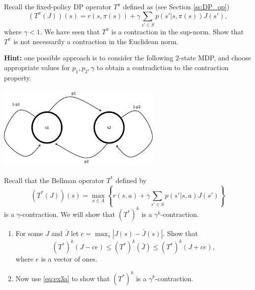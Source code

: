 \begin{exercise}
Recall the fixed-policy DP operator ${T^\pi }$ defined as (see Section \ref{ss:DP_op})
\[\left( {{T^\pi }\left( J \right)} \right)\left( s \right) = r\left( {s,\pi (s)} \right) + \gamma {\sum _{s' \in S}}p\left( {s'|s,\pi (s)} \right)J\left( {s'} \right),\]
where $\gamma  < 1$. We have seen that ${T^\pi }$ is a contraction in the sup-norm. Show that ${T^\pi }$ is not necessarily a contraction in the Euclidean norm.

\textbf{Hint: }one possible approach is to consider the following 2-state MDP, and choose appropriate values for ${p_1},{p_2},\gamma $ to obtain a contradiction to the contraction property.
\begin{center}
\includegraphics[width=0.6\textwidth]{hw3_c}
\end{center}
\end{exercise}

\begin{exercise}
Recall that the Bellman operator ${T^*}$  defined by
\[\left( {{T^*}\left( J \right)} \right)\left( s \right) = {\max _{a \in A}}\left\{ {r\left( {s,a} \right) + \gamma {\sum _{s' \in S}}p\left( {s'|s,a} \right)J\left( {s'} \right)} \right\}\]
is a $\gamma$-contraction. We will show that ${\left( {{T^*}} \right)^k}$ is a ${\gamma ^k}$-contraction.
\begin{enumerate}
  \item For some $J$  and $\bar J$ let $c = {\max _s}\left| {J\left( s \right) - \bar J\left( s \right)} \right|$. Show that
\begin{equation}\label{eq:ex3a}
{\left( {{T^*}} \right)^k}\left( {J - ce} \right) \le {\left( {{T^*}} \right)^k}\left( {\bar J} \right) \le {\left( {{T^*}} \right)^k}\left( {J + ce} \right),
\end{equation}
where $e$ is a vector of ones.
  \item Now use \eqref{eq:ex3a} to show that  ${\left( {{T^*}} \right)^k}$ is a ${\gamma ^k}$-contraction.
\end{enumerate}
\end{exercise}

